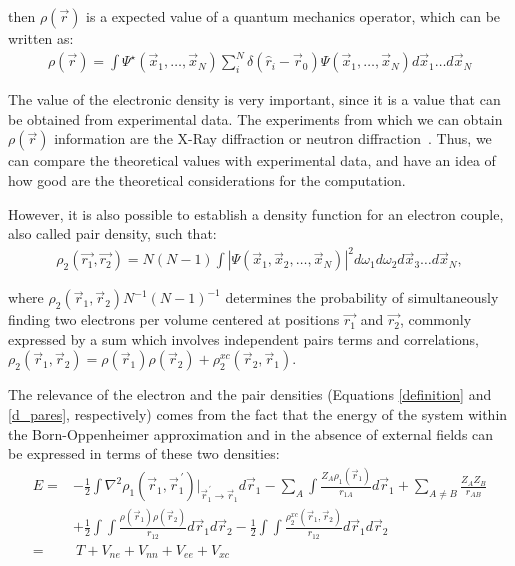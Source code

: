 \noindent then $\rho (\vec{r})$ is a expected value of a quantum mechanics operator,
which can be written as:
%
\begin{align}
\rho (\vec{r})= \int\Psi^{\star} (\vec{x}_1, \ldots , \vec{x}_N)
\sum_i ^N \delta (\hat{r}_i - \vec{r}_0) \Psi (\vec{x}_1, \ldots , \vec{x}_N)
d\vec{x}_1 \ldots d\vec{x}_N 
\end{align}

The value of the electronic density is very important,
since it is a value that can be obtained from experimental data. The
experiments from which we can obtain $\rho (\vec{r})$ information are
the X-Ray diffraction or neutron diffraction~\cite{Kasai2018, Coppens1971}.
Thus, we can compare the theoretical values with experimental
data, and have an idea of how good are the theoretical
considerations for the computation.

However, it is also possible to establish a density function for an electron
couple, also called pair density, such that:
%
\begin{align}
\rho_2(\vec{r_1},\vec{r_2})=N(N-1)\int |\Psi (\vec{x}_1 ,  \vec{x}_2,  \ldots , \vec{x}_N)|^2
d\omega_1 d\omega_2  d\vec{x}_3 \ldots d\vec{x}_N ,
\label{d_pares}
\end{align}

\noindent where $\rho_2(\vec{r}_1,\vec{r}_2)N^{-1}(N-1)^{-1}$ determines
the probability of simultaneously finding two electrons per volume
centered at positions
$\vec{r_1}$ and $\vec{r_2}$, commonly expressed by a sum which involves
independent
pairs terms and correlations,
$\rho_2(\vec{r}_1, \vec{r}_2) = \rho(\vec{r}_1)\rho(\vec{r}_2)
+ \rho_2^{xc}(\vec{r}_2, \vec{r}_1)$.

The relevance of the electron and the pair densities
(Equations \ref{definition} and \ref{d_pares}, respectively)
comes from the fact that the energy of the system within the Born-Oppenheimer
approximation and in the absence of external fields can be expressed
in terms of these two densities:
%
\begin{align} E=&-\frac{1}{2}\int\nabla^{2}\rho_{1}(\vec{r}_1,
\vec{r}^{\,\prime}_1) \biggr |_{\vec{r}^{\,\prime}_1 \rightarrow \vec{r}_1}
d\vec{r}_1 -\sum_{A}\int\frac{Z_A \rho_1 (\vec{r}_1)}{r_{1A}}d\vec{r}_1
+\sum_{A\neq B}\frac{Z_A Z_{B}}{r_{AB}} \nonumber \\
\phantom{=}&+\frac{1}{2}\int\int\frac{\rho (\vec{r}_1) \rho
(\vec{r}_2)}{r_{12}} d\vec{r}_1 d\vec{r}_2
-\frac{1}{2}\int\int\frac{\rho_2^{xc}(\vec{r}_1, \vec{r}_2)}{r_{12}} d\vec{r}_1
d\vec{r}_2 \nonumber \\ =&\ T + V_{ne} + V_{nn} + V_{ee} + V_{xc}
\label{E_b-o} \end{align}

